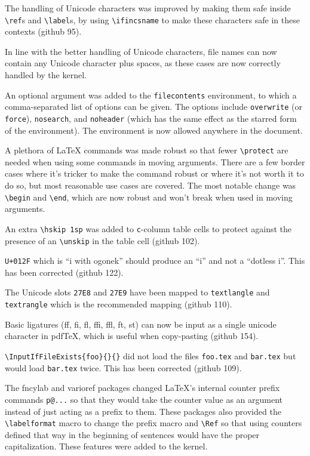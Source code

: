 \documentclass{ltxguide}
\newcommand\ghissue[1]{github #1}
\newcommand\ghissue[1]{%
    \href{https://github.com/latex3/latex2e/issues/#1}{github #1}}
\begin{document}
The handling of Unicode characters was improved by making them safe
inside \verb|\ref|s and \verb|\label|s, by using \verb|\ifincsname|
to make these characters safe in these contexts (\ghissue{95}).

In line with the better handling of Unicode characters, file names
can now contain any Unicode character plus spaces, as these cases
are now correctly handled by the kernel.

An optional argument was added to the \texttt{filecontents} environment,
to which a comma-separated list of options can be given. The options
include \texttt{overwrite} (or \texttt{force}), \texttt{nosearch}, and
\texttt{noheader} (which has the same effect as the starred form of the
environment). The environment is now allowed anywhere in the document.

A plethora of \LaTeX{} commands was made robust so that fewer
\verb|\protect| are needed when using some commands in moving arguments.
There are a few border cases where it's tricker to make the command
robust or where it's not worth it to do so, but most reasonable use
cases are covered. The most notable change was \verb|\begin| and
\verb|\end|, which are now robust and won't break when used in moving
arguments.

An extra \verb|\hskip 1sp| was added to \verb|c|-column table cells to
protect against the presence of an \verb|\unskip| in the table cell
(\ghissue{102}).

\texttt{U+012F} which is ``i with ogonek'' should produce an
``i'' and not a ``dotless i''. This has been corrected
(\ghissue{122}).

The Unicode slots \texttt{27E8} and \texttt{27E9} have been mapped to
\verb|textlangle| and \verb|textrangle| which is the recommended mapping
(\ghissue{110}).

Basic ligatures (ff, fi, fl, ffi, ffl, ft, st) can now be input as a
single unicode character in pdf\TeX, which is useful when copy-pasting
(\ghissue{154}).

\verb|\InputIfFileExists{foo}{}{}|
did not load the files \texttt{foo.tex} and \texttt{bar.tex} but
would load \texttt{bar.tex} twice. This has been corrected (\ghissue{109}).

The \textsf{fncylab} and \textsf{varioref} packages changed \LaTeX's internal
counter prefix commands \verb|p@...| so that they would take the counter
value as an argument instead of just acting as a prefix to them. These
packages also provided the \verb|\labelformat| macro to change the prefix
macro and \verb|\Ref| so that using counters defined that way in the
beginning of sentences would have the proper capitalization. These features
were added to the \LaTeXe{} kernel.
\end{document}
